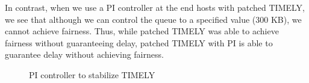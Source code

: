 In contrast, when we use a PI controller at the end hosts with patched
TIMELY, we see that although we can control the queue
to a specified value (300 KB), we cannot achieve fairness. Thus, while
patched TIMELY was able to achieve fairness without guaranteeing
delay, patched TIMELY with PI is able to guarantee delay without
achieving fairness.
\begin{figure}
\center
{}
\caption{PI controller to stabilize TIMELY}
\label{fig:dcqcn_pi}
\end{figure}

